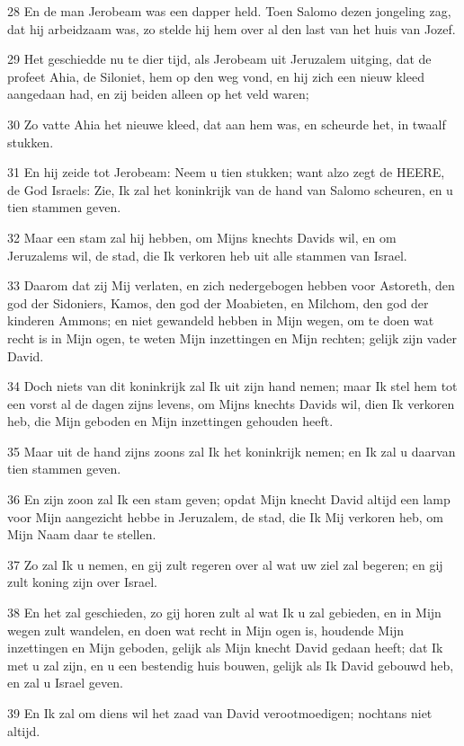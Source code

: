 \par 28 En de man Jerobeam was een dapper held. Toen Salomo dezen jongeling zag, dat hij arbeidzaam was, zo stelde hij hem over al den last van het huis van Jozef.
\par 29 Het geschiedde nu te dier tijd, als Jerobeam uit Jeruzalem uitging, dat de profeet Ahia, de Siloniet, hem op den weg vond, en hij zich een nieuw kleed aangedaan had, en zij beiden alleen op het veld waren;
\par 30 Zo vatte Ahia het nieuwe kleed, dat aan hem was, en scheurde het, in twaalf stukken.
\par 31 En hij zeide tot Jerobeam: Neem u tien stukken; want alzo zegt de HEERE, de God Israels: Zie, Ik zal het koninkrijk van de hand van Salomo scheuren, en u tien stammen geven.
\par 32 Maar een stam zal hij hebben, om Mijns knechts Davids wil, en om Jeruzalems wil, de stad, die Ik verkoren heb uit alle stammen van Israel.
\par 33 Daarom dat zij Mij verlaten, en zich nedergebogen hebben voor Astoreth, den god der Sidoniers, Kamos, den god der Moabieten, en Milchom, den god der kinderen Ammons; en niet gewandeld hebben in Mijn wegen, om te doen wat recht is in Mijn ogen, te weten Mijn inzettingen en Mijn rechten; gelijk zijn vader David.
\par 34 Doch niets van dit koninkrijk zal Ik uit zijn hand nemen; maar Ik stel hem tot een vorst al de dagen zijns levens, om Mijns knechts Davids wil, dien Ik verkoren heb, die Mijn geboden en Mijn inzettingen gehouden heeft.
\par 35 Maar uit de hand zijns zoons zal Ik het koninkrijk nemen; en Ik zal u daarvan tien stammen geven.
\par 36 En zijn zoon zal Ik een stam geven; opdat Mijn knecht David altijd een lamp voor Mijn aangezicht hebbe in Jeruzalem, de stad, die Ik Mij verkoren heb, om Mijn Naam daar te stellen.
\par 37 Zo zal Ik u nemen, en gij zult regeren over al wat uw ziel zal begeren; en gij zult koning zijn over Israel.
\par 38 En het zal geschieden, zo gij horen zult al wat Ik u zal gebieden, en in Mijn wegen zult wandelen, en doen wat recht in Mijn ogen is, houdende Mijn inzettingen en Mijn geboden, gelijk als Mijn knecht David gedaan heeft; dat Ik met u zal zijn, en u een bestendig huis bouwen, gelijk als Ik David gebouwd heb, en zal u Israel geven.
\par 39 En Ik zal om diens wil het zaad van David verootmoedigen; nochtans niet altijd.
